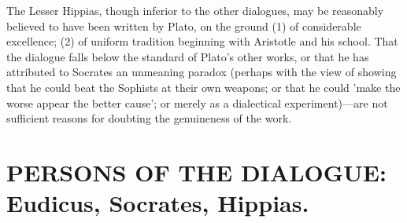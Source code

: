 \documentclass[11pt,letter]{article}
\begin{document}
\par  The Lesser Hippias, though inferior to the other dialogues, may be reasonably believed to have been written by Plato, on the ground (1) of considerable excellence; (2) of uniform tradition beginning with Aristotle and his school. That the dialogue falls below the standard of Plato's other works, or that he has attributed to Socrates an unmeaning paradox (perhaps with the view of showing that he could beat the Sophists at their own weapons; or that he could 'make the worse appear the better cause'; or merely as a dialectical experiment)—are not sufficient reasons for doubting the genuineness of the work.

\par 
\section{
      PERSONS OF THE DIALOGUE: Eudicus, Socrates, Hippias.
    }
\par 

\par 
\end{document}
